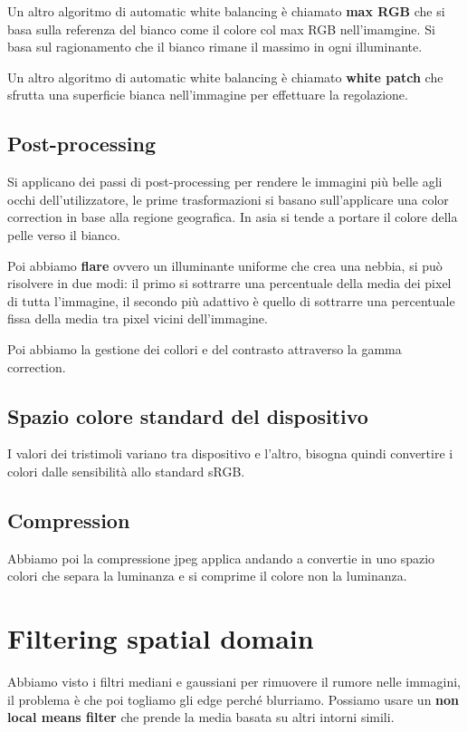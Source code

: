 Un altro algoritmo di automatic white balancing è chiamato \textbf{max RGB} che 
si basa sulla referenza del bianco come il colore col max RGB nell'imamgine. Si basa 
sul ragionamento che il bianco rimane il massimo in ogni illuminante.

Un altro algoritmo di automatic white balancing è chiamato \textbf{white patch}
che sfrutta una superficie bianca nell'immagine per effettuare la regolazione.


\subsection{Post-processing}
Si applicano dei passi di post-processing per rendere le immagini più belle agli 
occhi dell'utilizzatore, le prime trasformazioni si basano sull'applicare una color 
correction in base alla regione geografica. In asia si tende a portare il colore della 
pelle verso il bianco.

Poi abbiamo \textbf{flare} ovvero un illuminante uniforme che crea una nebbia, si può
risolvere in due modi: il primo si sottrarre una percentuale della media dei pixel 
di tutta l'immagine, il secondo più adattivo è quello di sottrarre una percentuale 
fissa della media tra pixel vicini dell'immagine.

Poi abbiamo la gestione dei collori e del contrasto attraverso la gamma correction.

\subsection{Spazio colore standard del dispositivo}
I valori dei tristimoli variano tra dispositivo e l'altro, bisogna quindi convertire 
i colori dalle sensibilità allo standard sRGB.

\subsection{Compression}
Abbiamo poi la compressione jpeg applica andando a convertie in uno spazio colori 
che separa la luminanza e si comprime il colore non la luminanza.

\section{Filtering spatial domain}
Abbiamo visto i filtri mediani e gaussiani per rimuovere il rumore nelle immagini, 
il problema è che poi togliamo gli edge perché blurriamo. Possiamo usare un \textbf{non 
local means filter} che prende la media basata su altri intorni simili.

